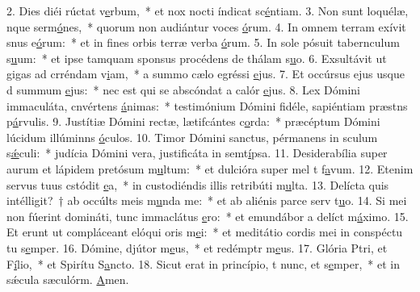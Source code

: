 2. Dies diéi rúctat v\uline{e}rbum,~* et nox nocti índicat sc\uline{é}ntiam.
3. Non sunt loquélæ, nque serm\uline{ó}nes,~* quorum non audiántur voces \uline{ó}rum.
4. In omnem terram exívit snus e\uline{ó}rum:~* et in fines orbis terræ verba \uline{ó}rum.
5. In sole pósuit tabernculum s\uline{u}um:~* et ipse tamquam sponsus procédens de thálam s\uline{u}o.
6. Exsultávit ut gigas ad crréndam v\uline{i}am,~* a summo cælo egréssi \uline{e}jus.
7. Et occúrsus ejus usque d summum \uline{e}jus:~* nec est qui se abscóndat a calór \uline{e}jus.
8. Lex Dómini immaculáta, cnvértens \uline{á}nimas:~* testimónium Dómini fidéle, sapiéntiam præstns p\uline{á}rvulis.
9. Justítiæ Dómini rectæ, lætifcántes c\uline{o}rda:~* præcéptum Dómini lúcidum illúminns \uline{ó}culos.
10. Timor Dómini sanctus, pérmanens in sculum s\uline{ǽ}culi:~* judícia Dómini vera, justificáta in semt\uline{í}psa.
11. Desiderabília super aurum et lápidem pretósum m\uline{u}ltum:~* et dulcióra super mel t f\uline{a}vum.
12. Etenim servus tuus cstódit \uline{e}a,~* in custodiéndis illis retribúti m\uline{u}lta.
13. Delícta quis intélligit?~† ab occúlts meis m\uline{u}nda me:~* et ab aliénis parce serv t\uline{u}o.
14. Si mei non fúerint domináti, tunc immaclátus \uline{e}ro:~* et emundábor a delíct m\uline{á}ximo.
15. Et erunt ut compláceant elóqui oris m\uline{e}i:~* et meditátio cordis mei in conspéctu tu s\uline{e}mper.
16. Dómine, djútor m\uline{e}us,~* et redémptr m\uline{e}us.
17. Glória Ptri, et F\uline{í}lio,~* et Spirítu S\uline{a}ncto.
18. Sicut erat in princípio, t nunc, et s\uline{e}mper,~* et in sǽcula sæculórm. \uline{A}men.
